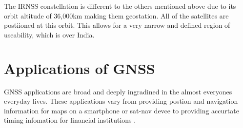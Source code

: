 The IRNSS constellation is different to the others mentioned above due to its orbit altitude of 36,000km making them geostation. All of the satellites are postiioned at
this orbit. This allows for a very narrow and defined region of useability, which is over India. 

\section{Applications of GNSS}
GNSS applications are broad and deeply ingradined in the almost everyones everyday lives. These applications vary from providing postion and navigation information for
maps on a smartphone or sat-nav devce to providing accurtate timing infomation for financial institutions \cite{RN33}. 